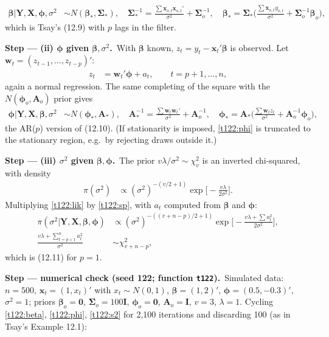 \documentclass[11pt,a4paper]{article}
\newcommand{\passo}[2]{\par\smallskip\noindent\textbf{Step --- #1.}~#2}
\begin{document}
\begin{sol}
{\begin{align}
\boldsymbol\beta|\boldsymbol Y,\boldsymbol X,\boldsymbol\phi,\sigma^2&\sim N(\boldsymbol\beta_*,\boldsymbol\Sigma_*),\quad
\boldsymbol\Sigma_*^{-1}=\frac{\sum\boldsymbol x_{o,t}\boldsymbol x_{o,t}'}{\sigma^2}+\boldsymbol\Sigma_o^{-1},\quad
\boldsymbol\beta_*=\boldsymbol\Sigma_*\Big(\frac{\sum\boldsymbol x_{o,t}y_{o,t}}{\sigma^2}+\boldsymbol\Sigma_o^{-1}\boldsymbol\beta_o\Big),\label{t122:beta}
\end{align}
which is Tsay's (12.9) with $p$ lags in the filter.}
\passo{(ii) $\boldsymbol\phi$ given $\boldsymbol\beta,\sigma^2$}{With $\boldsymbol\beta$ known, $z_t=y_t-\boldsymbol x_t'\boldsymbol\beta$ is observed. Let $\boldsymbol w_t=(z_{t-1},\ldots,z_{t-p})'$:
\begin{align}
z_t&=\boldsymbol w_t'\boldsymbol\phi+a_t,\qquad t=p+1,\ldots,n,\label{t122:ar}
\end{align}
again a normal regression. The same completing of the square with the $N(\boldsymbol\phi_o,\boldsymbol A_o)$ prior gives
\begin{align}
\boldsymbol\phi|\boldsymbol Y,\boldsymbol X,\boldsymbol\beta,\sigma^2&\sim N(\boldsymbol\phi_*,\boldsymbol A_*),\quad
\boldsymbol A_*^{-1}=\frac{\sum\boldsymbol w_t\boldsymbol w_t'}{\sigma^2}+\boldsymbol A_o^{-1},\quad
\boldsymbol\phi_*=\boldsymbol A_*\Big(\frac{\sum\boldsymbol w_tz_t}{\sigma^2}+\boldsymbol A_o^{-1}\boldsymbol\phi_o\Big),\label{t122:phi}
\end{align}
the AR($p$) version of (12.10). (If stationarity is imposed, \eqref{t122:phi} is truncated to the stationary region, e.g.\ by rejecting draws outside it.)}
\passo{(iii) $\sigma^2$ given $\boldsymbol\beta,\boldsymbol\phi$}{The prior $v\lambda/\sigma^2\sim\chi^2_v$ is an inverted chi-squared, with density
\begin{align}
\pi(\sigma^2)&\propto(\sigma^2)^{-(v/2+1)}\exp\Big[-\frac{v\lambda}{2\sigma^2}\Big].\label{t122:sp}
\end{align}
Multiplying \eqref{t122:lik} by \eqref{t122:sp}, with $a_t$ computed from $\boldsymbol\beta$ and $\boldsymbol\phi$:
\begin{align}
\pi(\sigma^2|\boldsymbol Y,\boldsymbol X,\boldsymbol\beta,\boldsymbol\phi)&\propto(\sigma^2)^{-((v+n-p)/2+1)}\exp\Big[-\frac{v\lambda+\sum a_t^2}{2\sigma^2}\Big],\label{t122:s1}\\
\frac{v\lambda+\sum_{t=p+1}^na_t^2}{\sigma^2}&\sim\chi^2_{v+n-p},\label{t122:s2}
\end{align}
which is (12.11) for $p=1$.}
\passo{numerical check (seed 122; function \texttt{t122})}{Simulated data: $n=500$, $\boldsymbol x_t=(1,x_t)'$ with $x_t\sim N(0,1)$, $\boldsymbol\beta=(1,2)'$, $\boldsymbol\phi=(0.5,-0.3)'$, $\sigma^2=1$; priors $\boldsymbol\beta_o=\mathbf 0$, $\boldsymbol\Sigma_o=100\boldsymbol I$, $\boldsymbol\phi_o=\mathbf 0$, $\boldsymbol A_o=\boldsymbol I$, $v=3$, $\lambda=1$. Cycling \eqref{t122:beta}, \eqref{t122:phi}, \eqref{t122:s2} for 2{,}100 iterations and discarding 100 (as in Tsay's Example 12.1):}

\end{sol}
\end{document}
